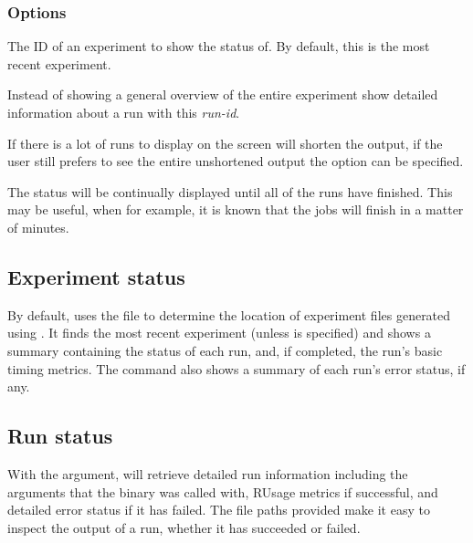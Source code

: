 \documentclass[a4paper,english]{article}
\begin{document}
\begin{adjustwidth}{18pt}{0pt}
            \subsubsection{Options}
                \begin{Description}[Options]
                  \item[\Arg{experiment-id}]
                    The ID of an experiment to show the status of.
                    By default, this is the most recent experiment.
                  \item[\OptArg{-i}{ run-id}]
                    Instead of showing a general overview of the entire experiment show detailed
                    information about a run with this \emph{run-id}.
                  \item[\Opt{\ddash full}]
                    If there is a lot of runs to display on the screen  will shorten the
                    output, if the user still prefers to see the entire unshortened output the
                     option can be specified.
                  \item[\Opt{\ddash follow}]
                    The status will be continually displayed until all of the runs have finished.
                    This may be useful, when for example, it is known that the jobs will finish
                    in a matter of minutes.
                \end{Description}

            \subsection{Experiment status}
                By default,   uses the  file to determine the
                location of experiment files generated using  .
                It finds the most recent experiment (unless  is specified) and shows a summary
                containing the status of each run, and, if completed, the run's basic timing metrics.
                The command also shows a summary of each run's error status, if any.

            \subsection{Run status}
                With the  argument,   will retrieve detailed
                run information including the arguments that the binary was called with, RUsage metrics
                if successful, and detailed error status if it has failed.
                The file paths provided make it easy to inspect the output of a run, whether it has
                succeeded or failed.


\end{adjustwidth}
\end{document}
